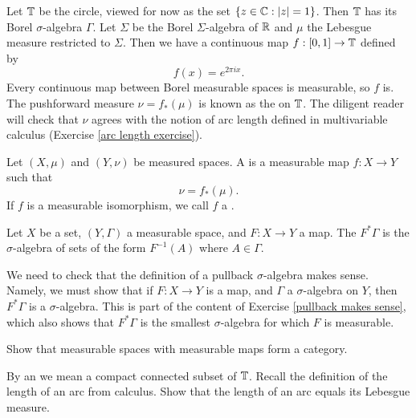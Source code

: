 \begin{example}
\label{lebesgue measure torus}
Let $\mathbb{T}$ be the circle, viewed for now as the set $\{z \in \mathbb{C}: |z| = 1\}$.
Then $\mathbb{T}$ has its Borel $\sigma$-algebra $\Gamma$.
Let $\Sigma$ be the Borel $\Sigma$-algebra of $\mathbb{R}$ and $\mu$ the Lebesgue measure restricted to $\Sigma$.
Then we have a continuous map $f: [0, 1] \to \mathbb{T}$ defined by
$$f(x) = e^{2\pi ix}.$$
Every continuous map between Borel measurable spaces is measurable, so $f$ is.
The pushforward measure $\nu = f_*(\mu)$ is known as the  on $\mathbb{T}$.
The diligent reader will check that $\nu$ agrees with the notion of arc length defined in multivariable calculus (Exercise \ref{arc length exercise}).
\end{example}

\begin{definition}
Let $(X, \mu)$ and $(Y, \nu)$ be measured spaces.
A  is a measurable map $f: X \to Y$ such that
$$\nu = f_*(\mu).$$
If $f$ is a measurable isomorphism, we call $f$ a .
\end{definition}

\begin{definition}
Let $X$ be a set, $(Y, \Gamma)$ a measurable space, and $F: X \to Y$ a map.
The  $F^*\Gamma$ is the $\sigma$-algebra of sets of the form $F^{-1}(A)$ where $A \in \Gamma$.
\end{definition}

\begin{subsec}
We need to check that the definition of a pullback $\sigma$-algebra makes sense.
Namely, we must show that if $F: X \to Y$ is a map, and $\Gamma$ a $\sigma$-algebra on $Y$, then $F^*\Gamma$ is a $\sigma$-algebra.
This is part of the content of Exercise \ref{pullback makes sense}, which also shows that $F^*\Gamma$ is the smallest $\sigma$-algebra for which $F$ is measurable.
\end{subsec}

\begin{exercise}
Show that measurable spaces with measurable maps form a category.
\end{exercise}

\begin{exercise}
\label{arc length exercise}
By an  we mean a compact connected subset of $\mathbb{T}$.
Recall the definition of the length of an arc from calculus.
Show that the length of an arc equals its Lebesgue measure.
\end{exercise}

